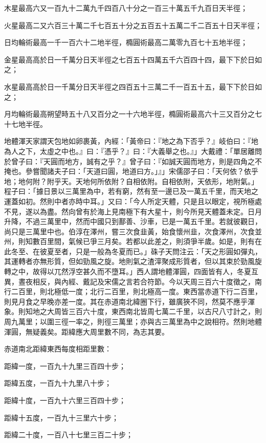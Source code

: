 \begin{pinyinscope}
木星最高六又一百九十二萬九千四百八十分之一百三十萬五千九百日天半徑；

火星最高二又六百三十萬二千七百五十分之五百五十五萬二千二百五十日天半徑；

日均輪術最高一千一百六十二地半徑，橢圓術最高二萬零九百七十五地半徑；

金星最高高於日一千萬分日天半徑之七百五十四萬五千六百四十四，最下下於日如之；

水星最高高於日一千萬分日天半徑之四百五十三萬二千一百五十五，最下下於日如之；

月均輪術最高朔望時五十八又百分之一十六地半徑，橢圓術最高六十三又百分之七十七地半徑。

地體渾天家謂天包地如卵裹黃，內經：「黃帝曰：『地之為下否乎？』岐伯曰：『地為人之下，太虛之中也。』曰：『憑乎？』曰：『大義舉之也。』」大戴禮：「單居離問於曾子曰：『天圓而地方，誠有之乎？』曾子曰：『如誠天圓而地方，則是四角之不掩也。參嘗聞諸夫子曰：「天道曰圓，地道曰方。」』」宋儒邵子曰：「天何依？依乎地；地何附？附乎天。天地何所依附？自相依附。自相依附，天依形，地附氣。」程子曰：「據日景以三萬里為中，若有窮，然有至一邊已及一萬五千里，而天地之運蓋如初。然則中者亦時中耳。」又曰：「今人所定天體，只是且以眼定，視所極處不見，遂以為盡。然向曾有於海上見南極下有大星十，則今所見天體蓋未定。日月升降，不過三萬里中，然而中國只到鄯善、沙車，已是一萬五千里。若就彼觀日，尚只是三萬里中也。伯淳在澤州，嘗三次食韭黃，始食懷州韭，次食澤州，次食並州，則知數百里間，氣候已爭三月矣。若都以此差之，則須爭半歲。如是，則有在此冬至、在彼夏至者，只是一般為冬夏而已。」硃子天問注云：「天之形圓如彈丸，其運轉者亦無形質，但如勁風之旋。地則氣之渣滓聚成形質者，但以其束於勁風旋轉之中，故得以兀然浮空甚久而不墮耳。」西人謂地體渾圓，四面皆有人，冬夏互異，晝夜相反，與內經、戴記及宋儒之言若合符節。今以天周三百六十度徵之，南行二百里，則北極低一度；北行二百里，則北極高一度。東西當赤道下行二百里，則見月食之早晚亦差一度。其在赤道南北緯圈下行，雖廣狹不同，然莫不應乎渾象。則知地之大周皆三百六十度，東西南北皆周七萬二千里，以古尺八寸計之，則周九萬里；以圍三徑一率之，則徑三萬里；亦與古三萬里為中之說相符。然則地體渾圓，無疑義矣。距緯應大周里數不同，為志其要。

赤道南北距緯東西每度相距里數：

距緯一度，一百九十九里三百四十步；

距緯五度，一百九十九里八十步；

距緯十度，一百九十六里三百四十步；

距緯十五度，一百九十三里六十步；

距緯二十度，一百八十七里三百二十步；


\end{pinyinscope}
